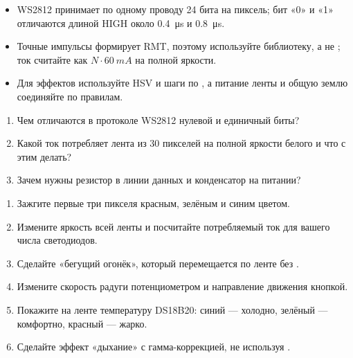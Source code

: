 \begin{summary}
\begin{itemize}[leftmargin=*]
  \item WS2812 принимает по одному проводу 24 бита на пиксель; бит «0» и «1» отличаются длиной HIGH около \SI{0.4}{\micro s} и \SI{0.8}{\micro s}.
  \item Точные импульсы формирует RMT, поэтому используйте библиотеку, а не ; ток считайте как $N\cdot\SI{60}{mA}$ на полной яркости.
  \item Для эффектов используйте HSV и шаги по , а питание ленты и общую землю соединяйте по правилам.
\end{itemize}
\end{summary}

\begin{selfcheck}
\begin{enumerate}
  \item Чем отличаются в протоколе WS2812 нулевой и единичный биты?
  \item Какой ток потребляет лента из 30 пикселей на полной яркости белого и что с этим делать?
  \item Зачем нужны резистор в линии данных и конденсатор на питании?
\end{enumerate}
\end{selfcheck}

\begin{tasks}
\begin{enumerate}
\item {} Зажгите первые три пикселя красным, зелёным и синим цветом.
\item {} Измените яркость всей ленты и посчитайте потребляемый ток для вашего числа светодиодов.
\item {} Сделайте «бегущий огонёк», который перемещается по ленте без .
\item {} Измените скорость радуги потенциометром и направление движения кнопкой.
\item {} Покажите на ленте температуру DS18B20: синий --- холодно, зелёный --- комфортно, красный --- жарко.
\item {} Сделайте эффект «дыхание» с гамма-коррекцией, не используя .
\end{enumerate}
\end{tasks}
